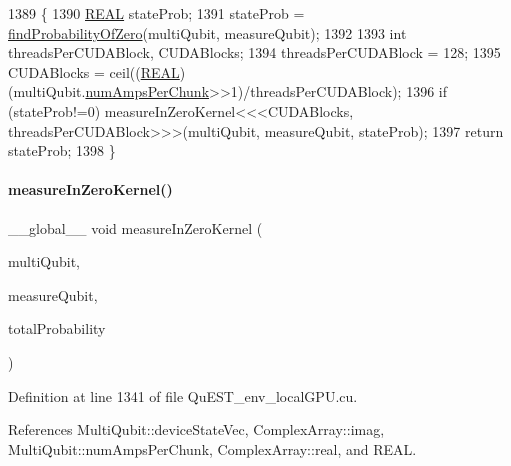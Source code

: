 \begin{DoxyCode}
1389 \{        
1390     \mbox{\hyperlink{QuEST__precision_8h_a4b654506f18b8bfd61ad2a29a7e38c25}{REAL}} stateProb;
1391     stateProb = \mbox{\hyperlink{QuEST__env__localGPU_8cu_a2e4cedb70bd181d250b3abb945cc108e}{findProbabilityOfZero}}(multiQubit, measureQubit);
1392 
1393     \textcolor{keywordtype}{int} threadsPerCUDABlock, CUDABlocks;
1394     threadsPerCUDABlock = 128;
1395     CUDABlocks = ceil((\mbox{\hyperlink{QuEST__precision_8h_a4b654506f18b8bfd61ad2a29a7e38c25}{REAL}})(multiQubit.\mbox{\hyperlink{structMultiQubit_a1cad83601a78635dd278259c7ed54f18}{numAmpsPerChunk}}>>1)/threadsPerCUDABlock);
1396     \textcolor{keywordflow}{if} (stateProb!=0) measureInZeroKernel<<<CUDABlocks, threadsPerCUDABlock>>>(multiQubit, measureQubit, 
      stateProb);
1397     \textcolor{keywordflow}{return} stateProb;
1398 \}
\end{DoxyCode}
\mbox{\label{QuEST__env__localGPU_8cu_a8f87a4777c69c875fece83d4b5eb29ba}} 
\paragraph{\texorpdfstring{measure\+In\+Zero\+Kernel()}{measureInZeroKernel()}}
{\footnotesize\ttfamily \+\_\+\+\_\+global\+\_\+\+\_\+ void measure\+In\+Zero\+Kernel (\begin{DoxyParamCaption}\item[{\mbox{\hyperlink{structMultiQubit}{Multi\+Qubit}}}]{multi\+Qubit,  }\item[{int}]{measure\+Qubit,  }\item[{\mbox{\hyperlink{QuEST__precision_8h_a4b654506f18b8bfd61ad2a29a7e38c25}{R\+E\+AL}}}]{total\+Probability }\end{DoxyParamCaption})}



Definition at line 1341 of file Qu\+E\+S\+T\+\_\+env\+\_\+local\+G\+P\+U.\+cu.



References Multi\+Qubit\+::device\+State\+Vec, Complex\+Array\+::imag, Multi\+Qubit\+::num\+Amps\+Per\+Chunk, Complex\+Array\+::real, and R\+E\+AL.



